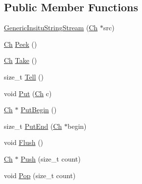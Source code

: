 \subsection*{Public Member Functions}
\begin{DoxyCompactItemize}
\item 
\mbox{\hyperlink{structrapidjson_1_1_generic_insitu_string_stream_a5a17e183fec782bf9bc11d247ffbee73}{Generic\+Insitu\+String\+Stream}} (\mbox{\hyperlink{structrapidjson_1_1_generic_insitu_string_stream_a3a7ed47ee193d1e5f850aa841b743631}{Ch}} $\ast$src)
\item 
\mbox{\hyperlink{structrapidjson_1_1_generic_insitu_string_stream_a3a7ed47ee193d1e5f850aa841b743631}{Ch}} \mbox{\hyperlink{structrapidjson_1_1_generic_insitu_string_stream_a0f88ca6c2d9ccd0c201ddb37dae39298}{Peek}} ()
\item 
\mbox{\hyperlink{structrapidjson_1_1_generic_insitu_string_stream_a3a7ed47ee193d1e5f850aa841b743631}{Ch}} \mbox{\hyperlink{structrapidjson_1_1_generic_insitu_string_stream_a99d4a96da7d602895136c90fed68695f}{Take}} ()
\item 
size\+\_\+t \mbox{\hyperlink{structrapidjson_1_1_generic_insitu_string_stream_a2a94ae3504087a55c85c73772eaf4405}{Tell}} ()
\item 
void \mbox{\hyperlink{structrapidjson_1_1_generic_insitu_string_stream_ab6e262e1319e2645870082a2da03ce50}{Put}} (\mbox{\hyperlink{structrapidjson_1_1_generic_insitu_string_stream_a3a7ed47ee193d1e5f850aa841b743631}{Ch}} c)
\item 
\mbox{\hyperlink{structrapidjson_1_1_generic_insitu_string_stream_a3a7ed47ee193d1e5f850aa841b743631}{Ch}} $\ast$ \mbox{\hyperlink{structrapidjson_1_1_generic_insitu_string_stream_a136bffd9cb0f8dc4aa3b768f14c50546}{Put\+Begin}} ()
\item 
size\+\_\+t \mbox{\hyperlink{structrapidjson_1_1_generic_insitu_string_stream_a75f19e02d6aa78478aab0d5a5c03c1c8}{Put\+End}} (\mbox{\hyperlink{structrapidjson_1_1_generic_insitu_string_stream_a3a7ed47ee193d1e5f850aa841b743631}{Ch}} $\ast$begin)
\item 
void \mbox{\hyperlink{structrapidjson_1_1_generic_insitu_string_stream_a95abb3fe7cc3b08ecb70d804eb234dc2}{Flush}} ()
\item 
\mbox{\hyperlink{structrapidjson_1_1_generic_insitu_string_stream_a3a7ed47ee193d1e5f850aa841b743631}{Ch}} $\ast$ \mbox{\hyperlink{structrapidjson_1_1_generic_insitu_string_stream_a33114ed86002c6ed6f1ca0bbbe3d5141}{Push}} (size\+\_\+t count)
\item 
void \mbox{\hyperlink{structrapidjson_1_1_generic_insitu_string_stream_affff67ccd9e6cd2816fd7e67cb5b147d}{Pop}} (size\+\_\+t count)
\end{DoxyCompactItemize}
